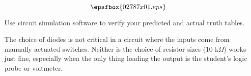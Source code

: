 

$$\epsfbox{02787x01.eps}$$

\vfil \eject






Use circuit simulation software to verify your predicted and actual truth tables.







The choice of diodes is not critical in a circuit where the inputs come from manually actuated switches.  Neither is the choice of resistor sizes (10 k$\Omega$) works just fine, especially when the only thing loading the output is the student's logic probe or voltmeter.




